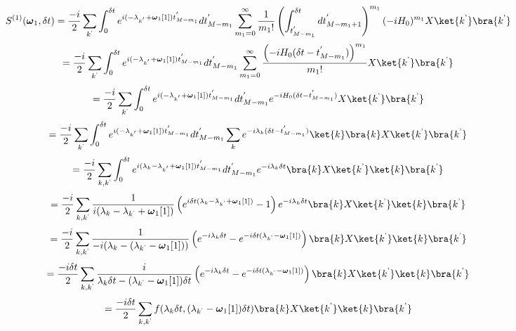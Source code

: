 \begin{equation*}
    S^{(1)}(\boldsymbol{\omega}_1, \delta t) = \frac{-i}{2}\sum_{k^\text{'}} \int_{0}^{\delta t}e^{i(-\lambda_{k^{'}}+\boldsymbol{\omega}_1[1])t^{'}_{M-m_1}} dt_{M-m_1}^{'} \sum_{m_1 = 0}^{\infty}\frac{1}{m_1!}\left(\int_{t^{'}_{M-m_1}}^{\delta t} dt^{'}_{M-m_1+1}\right)^{m_1}(-iH_0)^{m_1}X\ket{k^\text{'}}\bra{k^\text{'}}
\end{equation*}
\begin{equation*}
    = \frac{-i}{2}\sum_{k^\text{'}} \int_{0}^{\delta t}e^{i(-\lambda_{k^{'}}+\boldsymbol{\omega}_1[1])t^{'}_{M-m_1}} dt_{M-m_1}^{'} \sum_{m_1 = 0}^{\infty}\frac{\left(-iH_0(\delta t - t^{'}_{M-m_1})\right)^{m_1}}{m_1!}X\ket{k^\text{'}}\bra{k^\text{'}}
\end{equation*}
\begin{equation*}
    = \frac{-i}{2}\sum_{k^\text{'}} \int_{0}^{\delta t}e^{i(-\lambda_{k^{'}}+\boldsymbol{\omega}_1[1])t^{'}_{M-m_1}} dt_{M-m_1}^{'} e^{-iH_0(\delta t - t^{'}_{M-m_1})} X\ket{k^\text{'}}\bra{k^\text{'}}
\end{equation*}
\begin{equation*}
    = \frac{-i}{2}\sum_{k^\text{'}} \int_{0}^{\delta t}e^{i(-\lambda_{k^{'}}+\boldsymbol{\omega}_1[1])t^{'}_{M-m_1}} dt_{M-m_1}^{'} \sum_{k} e^{-i\lambda_k(\delta t -  t^{'}_{M-m_1})}\ket{k}\bra{k}X\ket{k^\text{'}}\bra{k^\text{'}}
\end{equation*}
\begin{equation*}
    = \frac{-i}{2}\sum_{k, k^\text{'}}\int_{0}^{\delta t}e^{i(\lambda_k -\lambda_{k^{'}}+\boldsymbol{\omega}_1[1])t^{'}_{M-m_1}} dt_{M-m_1}^{'} e^{-i\lambda_k\delta t} \bra{k}X\ket{k^\text{'}}\ket{k}\bra{k^\text{'}}
\end{equation*}
\begin{equation*}
    = \frac{-i}{2}\sum_{k, k^\text{'}}\frac{1}{i(\lambda_k - \lambda_{k^\text{'}} + \boldsymbol{\omega}_1[1])}\left(e^{i\delta t(\lambda_k - \lambda_{k^\text{'}} + \boldsymbol{\omega}_1[1])} - 1\right)e^{-i\lambda_k\delta t} \bra{k}X\ket{k^\text{'}}\ket{k}\bra{k^\text{'}}
\end{equation*}
\begin{equation*}
    = \frac{-i}{2}\sum_{k, k^\text{'}}\frac{1}{-i(\lambda_k - (\lambda_{k^\text{'}} - \boldsymbol{\omega}_1[1]))}\left(e^{-i\lambda_k\delta t} - e^{-i\delta t(\lambda_{k^\text{'}} - \boldsymbol{\omega}_1[1])} \right) \bra{k}X\ket{k^\text{'}}\ket{k}\bra{k^\text{'}}
\end{equation*}
\begin{equation*}
    = \frac{-i\delta t}{2}\sum_{k, k^\text{'}}\frac{i}{\lambda_k\delta t - (\lambda_{k^\text{'}} - \boldsymbol{\omega}_1[1])\delta t}\left(e^{-i\lambda_k\delta t} - e^{-i\delta t(\lambda_{k^\text{'}} - \boldsymbol{\omega}_1[1])} \right) \bra{k}X\ket{k^\text{'}}\ket{k}\bra{k^\text{'}}
\end{equation*}
\begin{equation}
    = \frac{-i\delta t}{2}\sum_{k, k^\text{'}}f(\lambda_k\delta t, (\lambda_{k^\text{'}}-\boldsymbol{\omega}_1[1])\delta t)\bra{k}X\ket{k^\text{'}}\ket{k}\bra{k^\text{'}}
\end{equation}

